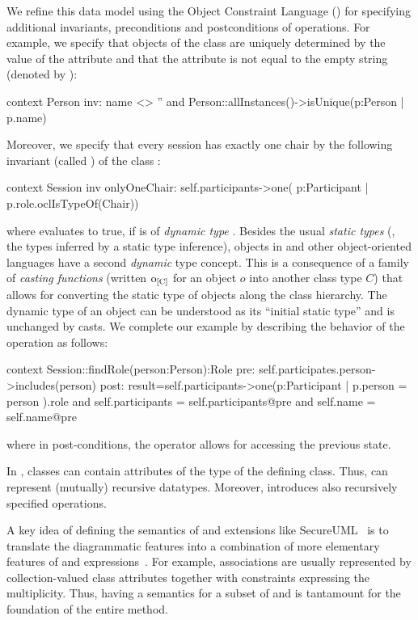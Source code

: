 We refine this data model using the Object Constraint Language (\OCL)
for specifying additional invariants, preconditions and postconditions
of operations. For example, we specify that objects of the class
 are uniquely determined by the value of the
 attribute and that the attribute  is
not equal to the empty string (denoted by ):
\begin{ocl}
context Person
  inv: name <> '' and
       Person::allInstances()->isUnique(p:Person | p.name)
\end{ocl}
Moreover, we specify that every session has exactly one chair by the
following invariant (called ) of the class
:
\begin{ocl}
context Session
  inv onlyOneChair: self.participants->one( p:Participant |
                                      p.role.oclIsTypeOf(Chair))
\end{ocl}
where  evaluates to true, if
 is of \emph{dynamic type}
. Besides the usual \emph{static types} (\ie, the
types inferred by a static type inference), objects in \UML and other
object-oriented languages have a second \emph{dynamic} type concept.
This is a consequence of a family of \emph{casting functions} (written
$\typeCast{o}{C}$ for an object $o$ into another class type $C$) that
allows for converting the static type of objects along the class
hierarchy. The dynamic type of an object can be understood as its
``initial static type'' and is unchanged by casts. We complete our
example by describing the behavior of the operation
 as follows:
\begin{ocl}
context Session::findRole(person:Person):Role
  pre:  self.participates.person->includes(person)
  post: result=self.participants->one(p:Participant |
                                p.person = person ).role
        and self.participants = self.participants@pre
        and self.name = self.name@pre
\end{ocl}
where in post-conditions, the operator  allows for
accessing the previous state.

In \UML, classes can contain attributes of the type of the
defining class.  Thus, \UML can represent (mutually) recursive
datatypes. Moreover, \OCL introduces also recursively specified
operations.

A key idea of defining the semantics of \UML and extensions like
SecureUML~\cite{brucker.ea:transformation:2006} is to translate the
diagrammatic \UML features into a combination of more elementary
features of \UML and \OCL
expressions~\cite{gogolla.ea:expressing:2001}. For example,
associations are usually represented by collection-valued class
attributes together with \OCL constraints expressing the
multiplicity. Thus, having a semantics for a subset of \UML and \OCL is
tantamount for the foundation of the entire method.
\endisatagafp



